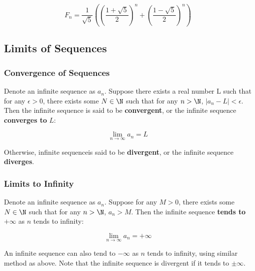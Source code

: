 $$F_{n}=\frac{1}{\sqrt{5}}\left( \left( \frac{1+\sqrt{5}}{2}\right) ^{n}+\left( \frac{1-\sqrt{5}}{2}\right) ^{n}\right)$$

\subsection{Limits of Sequences}
\subsubsection{Convergence of Sequences}
\begin{dft}
  Denote an infinite sequence as $a_{n}$. Suppose there exists a real number L such that for any $\epsilon>0$, there exists some $N\in \N$ such that for any $n>\N$, $\left| a_{n}-L\right| <\epsilon$. Then the infinite sequence is said to be \textbf{convergent}, or the infinite sequence \textbf{converges to} $L$:

  $$\lim_{n\to \infty}a_{n}=L$$\s

  Otherwise, infinite sequenceis said to be \textbf{divergent}, or the infinite sequence \textbf{diverges}.
\end{dft}

\subsubsection{Limits to Infinity}
\begin{dft}
  Denote an infinite sequence as $a_{n}$. Suppose for any $M>0$, there exists some $N\in \N$ such that for any $n>\N$, $a_{n}>M$. Then the infinite sequence \textbf{tends to} $+\infty$ as $n$ tends to infinity:

  $$\lim_{n\to \infty}a_{n}=+\infty$$
\end{dft}\n

An infinite sequence can also tend to $-\infty$ as $n$ tends to infinity, using similar method as above. Note that the infinite sequence is divergent if it tends to $\pm \infty$.


